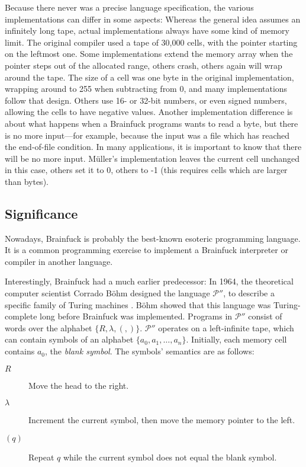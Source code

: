 Because there never was a precise language specification, the various implementations can differ in some aspects:
Whereas the general idea assumes an infinitely long tape, actual implementations always have some kind of memory limit. The original compiler used a tape of 30,000 cells, with the pointer starting on the leftmost one. Some implementations extend the memory array when the pointer steps out of the allocated range, others crash, others again will wrap around the tape.
The size of a cell was one byte in the original implementation, wrapping around to 255 when subtracting from 0, and many implementations follow that design. Others use 16- or 32-bit numbers, or even signed numbers, allowing the cells to have negative values.
Another implementation difference is about what happens when a Brainfuck programs wants to read a byte, but there is no more input---for example, because the input was a file which has reached the end-of-file condition. In many applications, it is important to know that there will be no more input. Müller's implementation leaves the current cell unchanged in this case, others set it to 0, others to -1 (this requires cells which are larger than bytes).

\subsection{Significance}

Nowadays, Brainfuck is probably the best-known esoteric programming language. It is a common programming exercise to implement a Brainfuck interpreter or compiler in another language.

\label{pprimeprime}

Interestingly, Brainfuck had a much earlier predecessor: In 1964, the theoretical computer scientist Corrado Böhm designed the language $\mathcal{P}''$, to describe a specific family of Turing machines \cite{bohm1964family}. Böhm showed that this language was Turing-complete long before Brainfuck was implemented. Programs in $\mathcal{P}''$ consist of words over the alphabet $\{R, \lambda, (, )\}$. $\mathcal{P}''$ operates on a left-infinite tape, which can contain symbols of an alphabet $\{a_0, a_1, \dots, a_n\}$. Initially, each memory cell contains $a_0$, the \emph{blank symbol}. The symbols' semantics are as follows:

\begin{description}
    \item[\boldmath$R$] Move the head to the right.
    \item[\boldmath$\lambda$] Increment the current symbol, then move the memory pointer to the left.
    \item[\boldmath$(q)$] Repeat $q$ while the current symbol does not equal the blank symbol.
\end{description}

